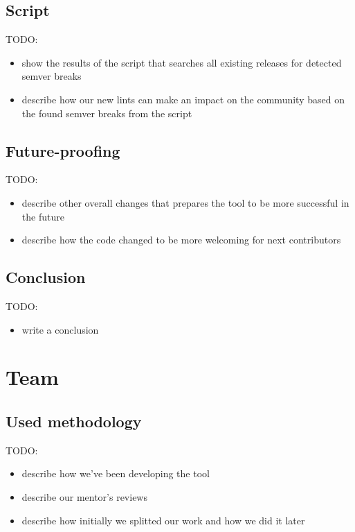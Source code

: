 \documentclass[licencjacka,en]{pracamgr}
\begin{document}
\section{Script}

TODO:
\begin{itemize}
	\item show the results of the script that searches all existing releases for detected semver breaks
	\item describe how our new lints can make an impact on the community based on the found semver breaks from the script
\end{itemize}

\section{Future-proofing}

TODO:
\begin{itemize}
	\item describe other overall changes that prepares the tool to be more successful in the future
	\item describe how the code changed to be more welcoming for next contributors
\end{itemize}

\section{Conclusion}

TODO:
\begin{itemize}
	\item write a conclusion
\end{itemize}

\chapter{Team}\label{r:chapter_team}

\section{Used methodology}

TODO:
\begin{itemize}
	\item describe how we've been developing the tool
	\item describe our mentor's reviews
	\item describe how initially we splitted our work and how we did it later
\end{itemize}
\end{document}
